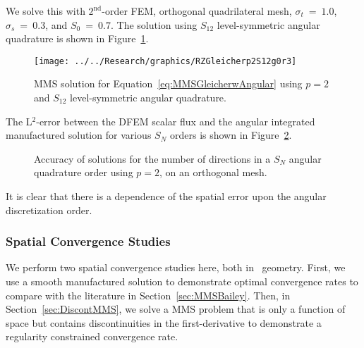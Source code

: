 \documentclass[12pt,letterpaper]{article}
\begin{document}
\noindent We solve this with $2^\text{nd}$-order FEM, orthogonal quadrilateral mesh, $\sigma_t~=~1.0$, $\sigma_s~=~0.3$, and $S_0~=~0.7$. The solution using $S_{12}$ level-symmetric angular quadrature is shown in Figure~\ref{fig:RZGleicherp2S12g0r3}.
%
\begin{figure}[!htb]
\centering
\texttt{[image: ../../Research/graphics/RZGleicherp2S12g0r3]}
\caption{MMS solution for Equation~\ref{eq:MMSGleicherwAngular} using $p=2$ and $S_{12}$ level-symmetric angular quadrature.}
\label{fig:RZGleicherp2S12g0r3}
\end{figure}
%
The L$^2$-error between the DFEM scalar flux and the angular integrated manufactured solution for various $S_N$ orders is shown in Figure~\ref{fig:RZGleicherp2g0r1}.
%
\begin{figure}[!htb]
\centering
{}
\caption{Accuracy of solutions for the number of directions in a $S_N$ angular quadrature order using $p=2$, on an orthogonal mesh.}
\label{fig:RZGleicherp2g0r1}
\end{figure}
%
It is clear that there is a dependence of the spatial error upon the angular discretization order.


\subsubsection{Spatial Convergence Studies}
\label{sec:RZSpatialConvergenceStudy}
We perform two spatial convergence studies here, both in \RZ\ geometry. First, we use a smooth manufactured solution to demonstrate optimal convergence rates to compare with the literature in Section~\ref{sec:MMSBailey}. Then, in Section~\ref{sec:DiscontMMS}, we solve a MMS problem that is only a function of space but contains discontinuities in the first-derivative to demonstrate a regularity constrained convergence rate.
\end{document}
